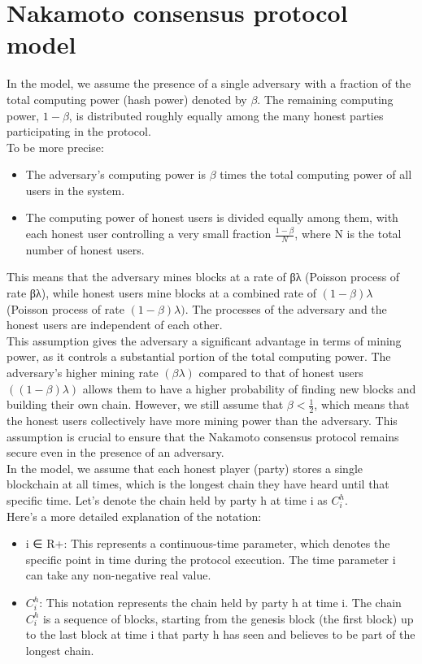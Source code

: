 \section{Nakamoto consensus protocol model}
In the model, we assume the presence of a single adversary with a fraction of the total computing power (hash power) denoted by $\beta$. The remaining computing power, $1 - \beta$, is distributed roughly equally among the many honest parties participating in the protocol.\\
To be more precise:
\begin{itemize}
	\item The adversary's computing power is $\beta$ times the total computing power of all users in the system.
	\item The computing power of honest users is divided equally among them, with each honest user controlling a very small fraction $\frac{1 - \beta}{N}$, where N is the total number of honest users. 
\end{itemize}
This means that the adversary mines blocks at a rate of βλ (Poisson process of rate βλ), while honest users mine blocks at a combined rate of $(1 - \beta)\lambda$ (Poisson process of rate $(1 - \beta)\lambda)$. The processes of the adversary and the honest users are independent of each other.\\
This assumption gives the adversary a significant advantage in terms of mining power, as it controls a substantial portion of the total computing power. The adversary's higher mining rate $(\beta\lambda)$ compared to that of honest users $((1 - \beta)\lambda)$ allows them to have a higher probability of finding new blocks and building their own chain. However, we still assume that $\beta < \frac{1}{2}$, which means that the honest users collectively have more mining power than the adversary. This assumption is crucial to ensure that the Nakamoto consensus protocol remains secure even in the presence of an adversary.\\
In the model, we assume that each honest player (party) stores a single blockchain at all times, which is the longest chain they have heard until that specific time. Let's denote the chain held by party h at time i as $C_{i}^{h}$.\\
Here's a more detailed explanation of the notation:\\
\begin{itemize}
	\item i ∈ R+: This represents a continuous-time parameter, which denotes the specific point in time during the protocol execution. The time parameter i can take any non-negative real value.
	\item $C_{i}^{h}$: This notation represents the chain held by party h at time i. The chain $C_{i}^{h}$ is a sequence of blocks, starting from the genesis block (the first block) up to the last block at time i that party h has seen and believes to be part of the longest chain.
\end{itemize}
